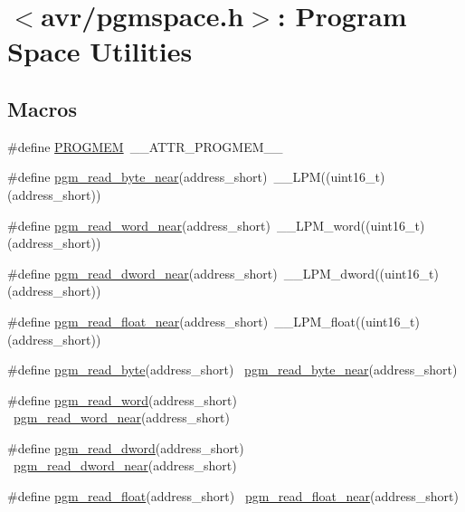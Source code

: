 \hypertarget{group__avr__pgmspace}{}\section{$<$avr/pgmspace.h$>$\+: Program Space Utilities}
\label{group__avr__pgmspace}
\subsection*{Macros}
\begin{DoxyCompactItemize}
\item 
\#define \hyperlink{group__avr__pgmspace_gad4e4bd82edf6d5d840462257528bea37}{P\+R\+O\+G\+M\+EM}~\+\_\+\+\_\+\+A\+T\+T\+R\+\_\+\+P\+R\+O\+G\+M\+E\+M\+\_\+\+\_\+
\item 
\#define \hyperlink{group__avr__pgmspace_ga88d7dd4863f87530e1a34ece430a587c}{pgm\+\_\+read\+\_\+byte\+\_\+near}(address\+\_\+short)~\+\_\+\+\_\+\+L\+PM((uint16\+\_\+t)(address\+\_\+short))
\item 
\#define \hyperlink{group__avr__pgmspace_gaf51eeaa847dd2668d2a66b70ecfb7398}{pgm\+\_\+read\+\_\+word\+\_\+near}(address\+\_\+short)~\+\_\+\+\_\+\+L\+P\+M\+\_\+word((uint16\+\_\+t)(address\+\_\+short))
\item 
\#define \hyperlink{group__avr__pgmspace_ga7fa92c0a662403a643859e0f33b0a182}{pgm\+\_\+read\+\_\+dword\+\_\+near}(address\+\_\+short)~\+\_\+\+\_\+\+L\+P\+M\+\_\+dword((uint16\+\_\+t)(address\+\_\+short))
\item 
\#define \hyperlink{group__avr__pgmspace_ga066040df814dabc7980cd1422508b46b}{pgm\+\_\+read\+\_\+float\+\_\+near}(address\+\_\+short)~\+\_\+\+\_\+\+L\+P\+M\+\_\+float((uint16\+\_\+t)(address\+\_\+short))
\item 
\#define \hyperlink{group__avr__pgmspace_ga349c2c134daa01aeea62256f1fd7489c}{pgm\+\_\+read\+\_\+byte}(address\+\_\+short)    ~\hyperlink{group__avr__pgmspace_ga88d7dd4863f87530e1a34ece430a587c}{pgm\+\_\+read\+\_\+byte\+\_\+near}(address\+\_\+short)
\item 
\#define \hyperlink{group__avr__pgmspace_ga6e58e62e197da722b973c33ba3e1fa07}{pgm\+\_\+read\+\_\+word}(address\+\_\+short)    ~\hyperlink{group__avr__pgmspace_gaf51eeaa847dd2668d2a66b70ecfb7398}{pgm\+\_\+read\+\_\+word\+\_\+near}(address\+\_\+short)
\item 
\#define \hyperlink{group__avr__pgmspace_gaf7a15983bd2edb2a8841246950c4710d}{pgm\+\_\+read\+\_\+dword}(address\+\_\+short)  ~\hyperlink{group__avr__pgmspace_ga7fa92c0a662403a643859e0f33b0a182}{pgm\+\_\+read\+\_\+dword\+\_\+near}(address\+\_\+short)
\item 
\#define \hyperlink{group__avr__pgmspace_ga8ff5ce55a4fa21ad4276a06737f8be7d}{pgm\+\_\+read\+\_\+float}(address\+\_\+short)  ~\hyperlink{group__avr__pgmspace_ga066040df814dabc7980cd1422508b46b}{pgm\+\_\+read\+\_\+float\+\_\+near}(address\+\_\+short)
\end{DoxyCompactItemize}


